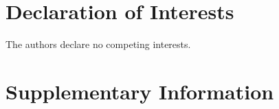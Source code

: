 \documentclass[5p]{elsarticle}
\begin{document}
\section*{Declaration of Interests}

The authors declare no competing interests.

\renewcommand{\ttdefault}{\sfdefault}



\newpage
\onecolumn

\makeatletter
\renewcommand \thesection{S\@arabic\c@section}
\renewcommand\thetable{S\@arabic\c@table}
\renewcommand \thefigure{S\@arabic\c@figure}
\makeatother
\renewcommand{\citenumfont}[1]{S#1}
\setcounter{equation}{0}
\setcounter{figure}{0}
\setcounter{table}{0}
\setcounter{section}{0}


\section*{Supplementary Information}
\label{sec:si}












%



\renewcommand{\ttdefault}{\sfdefault}
\end{document}
